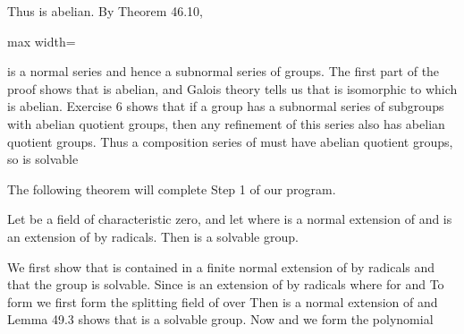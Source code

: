 \documentclass[11pt,oneside]{article}
\begin{document}
\begin{BookBody}

\noindent Thus  is abelian. By Theorem 46.10,

\begin{center}\begin{adjustbox}{max width=\linewidth}\end{adjustbox}\end{center}

\noindent is a normal series and hence a subnormal series of groups. The first part of the proof shows that  is abelian, and Galois theory tells us that  is isomorphic to  which is abelian. Exercise 6 shows that if a group has a subnormal series of subgroups with abelian quotient groups, then any refinement of this series also has abelian quotient groups. Thus a composition series of  must have abelian quotient groups, so  is solvable\BookEnd{\blacklozenge}

\noindent The following theorem will complete Step 1 of our program.

 Let  be a field of characteristic zero, and let  where  is a normal extension of  and  is an extension of  by radicals. Then  is a solvable group.

 We first show that  is contained in a finite normal extension  of  by radicals and that the group  is solvable. Since  is an extension of  by radicals  where  for  and  To form  we first form the splitting field  of  over  Then  is a normal extension of  and Lemma 49.3 shows that  is a solvable group. Now  and we form the polynomial


\end{BookBody}
\end{document}
